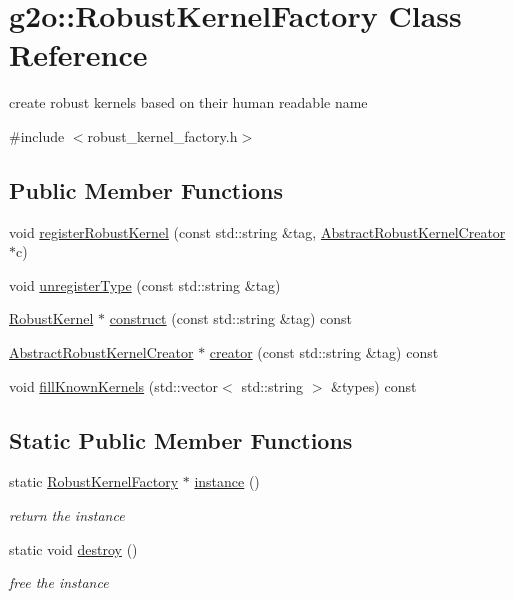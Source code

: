 \hypertarget{classg2o_1_1_robust_kernel_factory}{}\section{g2o\+:\+:Robust\+Kernel\+Factory Class Reference}
\label{classg2o_1_1_robust_kernel_factory}


create robust kernels based on their human readable name  




{\ttfamily \#include $<$robust\+\_\+kernel\+\_\+factory.\+h$>$}

\subsection*{Public Member Functions}
\begin{DoxyCompactItemize}
\item 
void \mbox{\hyperlink{classg2o_1_1_robust_kernel_factory_a71de3f228b58ae4a2dd965cc2cd8ff95}{register\+Robust\+Kernel}} (const std\+::string \&tag, \mbox{\hyperlink{classg2o_1_1_abstract_robust_kernel_creator}{Abstract\+Robust\+Kernel\+Creator}} $\ast$c)
\item 
void \mbox{\hyperlink{classg2o_1_1_robust_kernel_factory_af3b0dac653627b5f87c68d4180b87475}{unregister\+Type}} (const std\+::string \&tag)
\item 
\mbox{\hyperlink{classg2o_1_1_robust_kernel}{Robust\+Kernel}} $\ast$ \mbox{\hyperlink{classg2o_1_1_robust_kernel_factory_a031a4fdb890d6191c0bff8aedfb078c6}{construct}} (const std\+::string \&tag) const
\item 
\mbox{\hyperlink{classg2o_1_1_abstract_robust_kernel_creator}{Abstract\+Robust\+Kernel\+Creator}} $\ast$ \mbox{\hyperlink{classg2o_1_1_robust_kernel_factory_a3679a51bd829f6d47e8312d339339a79}{creator}} (const std\+::string \&tag) const
\item 
void \mbox{\hyperlink{classg2o_1_1_robust_kernel_factory_a078e96a0ca100165d18b146f07813765}{fill\+Known\+Kernels}} (std\+::vector$<$ std\+::string $>$ \&types) const
\end{DoxyCompactItemize}
\subsection*{Static Public Member Functions}
\begin{DoxyCompactItemize}
\item 
static \mbox{\hyperlink{classg2o_1_1_robust_kernel_factory}{Robust\+Kernel\+Factory}} $\ast$ \mbox{\hyperlink{classg2o_1_1_robust_kernel_factory_a9cc4361620f8d7269ad9774d3aba2fc0}{instance}} ()
\begin{DoxyCompactList}\small\item\em return the instance \end{DoxyCompactList}\item 
static void \mbox{\hyperlink{classg2o_1_1_robust_kernel_factory_a6c96f77eb4a14e5e8f5b46eb734c0393}{destroy}} ()
\begin{DoxyCompactList}\small\item\em free the instance \end{DoxyCompactList}\end{DoxyCompactItemize}
